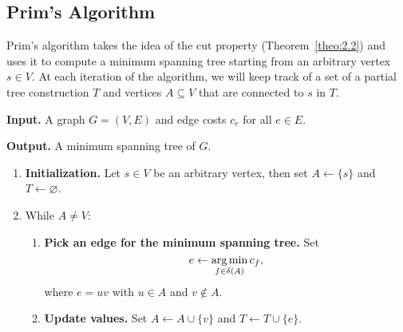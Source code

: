 \subsection{Prim's Algorithm}\label{subsec:2.3}
Prim's algorithm takes the idea of the cut property (Theorem~\ref{theo:2.2}) 
and uses it to compute a minimum spanning tree starting from an arbitrary 
vertex $s \in V$. At each iteration of the algorithm, we will keep track of a 
set of a partial tree construction $T$ and vertices $A \subseteq V$ that are 
connected to $s$ in $T$. 

\begin{mdframed}[
    linewidth=1pt,
    linecolor=black,
    bottomline=false,topline=false,rightline=false,
    innerrightmargin=0pt,innertopmargin=0pt,innerbottommargin=0pt,
    innerleftmargin=1em,%
    skipabove=0.75\baselineskip
]
{\bf Input.} A graph $G = (V, E)$ and edge costs $c_e$ for 
all $e \in E$. 

{\bf Output.} A minimum spanning tree of $G$.
\begin{enumerate}[leftmargin=1.75cm, label={Step \arabic*.}]
    \item {\bf Initialization.} Let $s \in V$ be an arbitrary vertex, 
    then set $A \gets \{s\}$ and $T \gets \varnothing$.

    \item While $A \neq V$:
    \begin{enumerate}[label={Step 2.\arabic*.}]
        \item {\bf Pick an edge for the minimum spanning tree.} 
        Set 
        \[ e \gets \operatorname*{arg\,min}_{f \in \delta(A)} c_f, \] 
        where $e = uv$ with $u \in A$ and $v \notin A$.  
        \item {\bf Update values.} Set $A \gets A \cup \{v\}$ and 
        $T \gets T \cup \{e\}$. 
    \end{enumerate}
\end{enumerate}
\end{mdframed}\vspace{-0.15cm}

